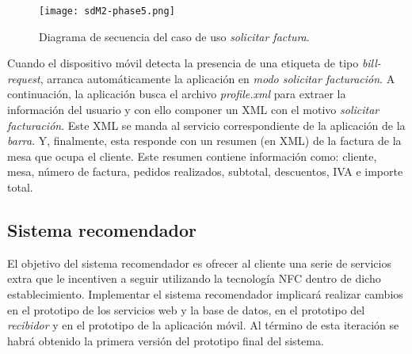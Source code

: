 \begin{itemize}
  \begin{sidewaysfigure}[!h]
    \begin{center}
      \texttt{[image: sdM2-phase5.png]}
      \caption{Diagrama de secuencia del caso de uso \emph{solicitar factura}.}
      \label{fig:sdM2-phase5}
    \end{center}
  \end{sidewaysfigure}

Cuando el dispositivo móvil detecta la presencia de una etiqueta de tipo
\emph{bill-request}, arranca automáticamente la aplicación en \emph{modo
solicitar facturación}. A continuación, la aplicación busca el archivo
\emph{profile.xml} para extraer la información del usuario y con ello componer
un \acs{XML} con el motivo \emph{solicitar facturación}. Este \acs{XML} se
manda al servicio correspondiente de la aplicación de la \emph{barra}. Y,
finalmente, esta responde con un resumen (en \acs{XML}) de la factura de la 
mesa que ocupa el cliente. Este resumen contiene información como: cliente, 
mesa, número de factura, pedidos realizados, subtotal, descuentos, IVA e
importe total.
\end{itemize}


\subsection{Sistema recomendador}
El objetivo del sistema recomendador es ofrecer al cliente una serie de
servicios extra que le incentiven a seguir utilizando la tecnología \acs{NFC}
dentro de dicho establecimiento. Implementar el sistema recomendador implicará
realizar cambios en el prototipo de los servicios web y la base de datos, en
el prototipo del \emph{recibidor} y en el prototipo de la aplicación móvil.
Al término de esta iteración se habrá obtenido la primera versión del prototipo
final del sistema.

